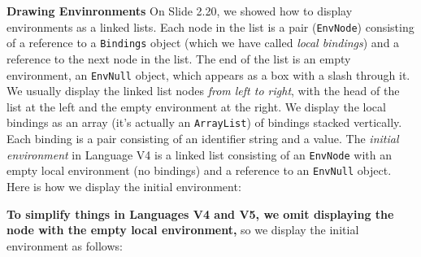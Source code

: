 \begin{minipage}[t]{\sw}
\slidenumber
\LARGE
{\bf Drawing Envinronments}\exx
On Slide 2.20, we showed how to display environments as a linked lists.
Each node in the list is a pair (\verb'EnvNode')
consisting of a reference to a \verb'Bindings' object
(which we have called {\em local bindings})
and a reference to the next node in the list.
The end of the list is an empty environment,
an \verb'EnvNull' object,
which appears as a box with a slash through it.
We usually display the linked list nodes {\em from left to right},
with the head of the list at the left
and the empty environment at the right.
We display the local bindings as an array
(it's actually an \verb'ArrayList') of bindings stacked vertically.
Each binding is a pair consisting of an identifier string
and a value.\exx
The {\em initial environment} in Language V4
is a linked list consisting of an \verb'EnvNode'
with an empty local environment (no bindings)
and a reference to an \verb'EnvNull' object.
Here is how we display the initial environment:
\centerline{}
{\bf To simplify things in Languages V4 and V5,
we omit displaying the node with the empty local environment,}
so we display the initial environment as follows:\exx
\centerline{}
\end{minipage}
\clearpage
